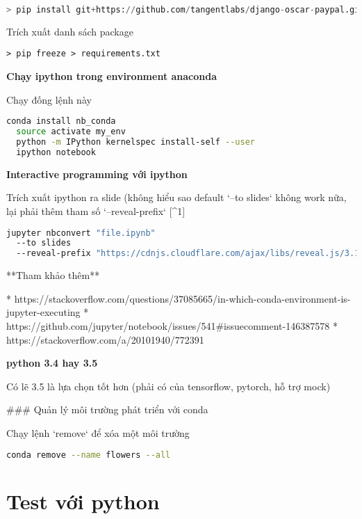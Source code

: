 \begin{lstlisting}[language=Python]
> pip install git+https://github.com/tangentlabs/django-oscar-paypal.git@issue/34/oscar-0.6#egg=django-oscar-paypal
\end{lstlisting}

\noindent Trích xuất danh sách package

\begin{lstlisting}
> pip freeze > requirements.txt
\end{lstlisting}

\noindent \textbf{Chạy ipython trong environment anaconda}

\noindent Chạy đống lệnh này

\begin{lstlisting}[language=bash]
  conda install nb_conda
  source activate my_env
  python -m IPython kernelspec install-self --user
  ipython notebook
\end{lstlisting}

\noindent \textbf{Interactive programming với ipython}

\noindent Trích xuất ipython ra slide (không hiểu sao default `--to slides` không work nữa, lại phải thêm tham số `--reveal-prefix` [^1]

\begin{lstlisting}[language=bash]
jupyter nbconvert "file.ipynb"
  --to slides
  --reveal-prefix "https://cdnjs.cloudflare.com/ajax/libs/reveal.js/3.1.0"
\end{lstlisting}

**Tham khảo thêm**

* https://stackoverflow.com/questions/37085665/in-which-conda-environment-is-jupyter-executing
* https://github.com/jupyter/notebook/issues/541#issuecomment-146387578
* https://stackoverflow.com/a/20101940/772391

\noindent \textbf{python 3.4 hay 3.5}

Có lẽ 3.5 là lựa chọn tốt hơn (phải có của tensorflow, pytorch, hỗ trợ mock)

### Quản lý môi trường phát triển với conda

Chạy lệnh `remove` để xóa một môi trường

\begin{lstlisting}[language=bash]
conda remove --name flowers --all
\end{lstlisting}

\section{Test với python}

